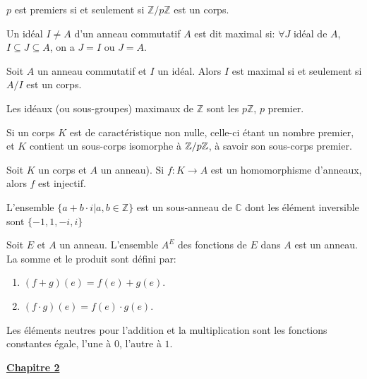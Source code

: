 \documentclass[12pt,a4paper]{article}
\begin{document}
\begin{flushleft}
\begin{prop}
$p$ est premiers si et seulement si $\mathbb{Z}/ p \mathbb{Z}$ est un corps.
\end{prop}

\begin{mydef}
Un idéal $I \neq A$ d'un anneau commutatif $A$ est dit maximal si:
$\forall J$ idéal de $A$, $I \subseteq J \subseteq A$, on a $J = I$ ou $J = A$.
\end{mydef}

\begin{prop}
Soit $A$ un anneau commutatif et $I$ un idéal. Alors $I$ est maximal si et seulement si $A/I$ est un corps.
\end{prop}

\begin{cor}
Les idéaux (ou sous-groupes) maximaux de $\mathbb{Z}$ sont les $p \mathbb{Z}$, $p$ premier.
\end{cor}

\begin{prop}
Si un corps $K$ est de caractéristique non nulle, celle-ci étant un nombre premier, et $K$ contient un sous-corps isomorphe à $\mathbb{Z} / p \mathbb{Z}$, à savoir son sous-corps premier.
\end{prop}

\begin{prop}
Soit $K$ un corps et $A$ un anneau). Si $f: K \rightarrow A$ est un homomorphisme d'anneaux, alors $f$ est injectif.
\end{prop}

\begin{prop}
L'ensemble $\{ a + b \cdot i| a, b \in \mathbb{Z} \} $ est un sous-anneau de $\mathbb{C}$ dont les élément inversible sont $\{-1, 1, -i, i \}$
\end{prop}

\begin{prop}
Soit $E$ et $A$ un anneau. L'ensemble $A^E$ des fonctions de $E$ dans $A$ est un anneau. La somme et le produit sont défini par: 
\begin{enumerate}
\item $(f+g)(e)= f(e) + g(e)$.
\item $(f \cdot g) (e) = f(e) \cdot g(e)$.
\end{enumerate}
Les éléments neutres pour l'addition et la multiplication sont les fonctions constantes égale, l'une à $0$, l'autre à $1$. 
\end{prop}


\textbf{\underline{Chapitre 2}}\\~\\


\end{flushleft}
\end{document}

